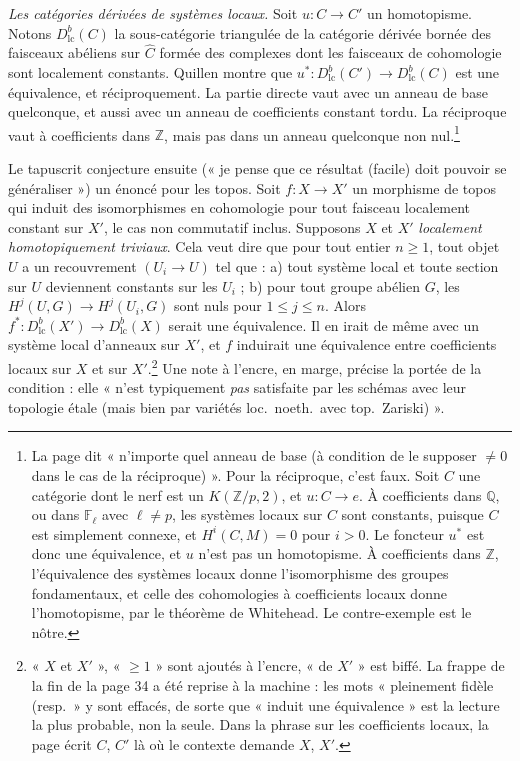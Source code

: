 \documentclass[11pt,a4paper]{article}
\begin{document}
\emph{Les catégories dérivées de systèmes locaux.} Soit $u : C \to C'$ un
homotopisme. Notons $D^{b}_{\mathrm{lc}}(C)$ la sous-catégorie triangulée de
la catégorie dérivée bornée des faisceaux abéliens sur $\widehat{C}$ formée des
complexes dont les faisceaux de cohomologie sont localement constants. Quillen
montre que $u^{*} : D^{b}_{\mathrm{lc}}(C') \to D^{b}_{\mathrm{lc}}(C)$ est une
équivalence, et réciproquement. La partie directe vaut avec un anneau de
base quelconque, et aussi avec un anneau de coefficients constant tordu. La
réciproque vaut à coefficients dans $\mathbb{Z}$, mais pas dans un anneau
quelconque non nul.\footnote{La page dit « n'importe quel anneau de base (à
condition de le supposer $\neq 0$ dans le cas de la réciproque) ». Pour la
réciproque, c'est faux. Soit $C$ une catégorie dont le nerf est un
$K(\mathbb{Z}/p, 2)$, et $u : C \to e$. À coefficients dans $\mathbb{Q}$, ou
dans $\mathbb{F}_{\ell}$ avec $\ell \neq p$, les systèmes locaux sur $C$ sont
constants, puisque $C$ est simplement connexe, et $H^{i}(C, M) = 0$ pour
$i > 0$. Le foncteur $u^{*}$ est donc une équivalence, et $u$ n'est pas un
homotopisme. À coefficients dans $\mathbb{Z}$, l'équivalence des systèmes
locaux donne l'isomorphisme des groupes fondamentaux, et celle des
cohomologies à coefficients locaux donne l'homotopisme, par le théorème de
Whitehead. Le contre-exemple est le nôtre.}

Le tapuscrit conjecture ensuite (« je pense que ce résultat (facile) doit
pouvoir se généraliser ») un énoncé pour les topos. Soit $f : X \to X'$ un
morphisme de topos qui induit des isomorphismes en cohomologie pour tout
faisceau localement constant sur $X'$, le cas non commutatif inclus. Supposons
$X$ et $X'$ \emph{localement homotopiquement triviaux}. Cela veut dire que pour
tout entier $n \geq 1$, tout objet $U$ a un recouvrement $(U_i \to U)$ tel que :
a) tout système local et toute section sur $U$ deviennent constants sur les
$U_i$ ; b) pour tout groupe abélien $G$, les $H^{j}(U, G) \to H^{j}(U_i, G)$
sont nuls pour $1 \leq j \leq n$. Alors $f^{*} : D^{b}_{\mathrm{lc}}(X') \to
D^{b}_{\mathrm{lc}}(X)$ serait une équivalence. Il en irait de même avec un
système local d'anneaux sur $X'$, et $f$ induirait une équivalence entre
coefficients locaux sur $X$ et sur $X'$.\footnote{« $X$ et $X'$ », « $\geq 1$ »
sont ajoutés à l'encre, « de $X'$ » est biffé. La frappe de la fin de la page 34
a été reprise à la machine : les mots « pleinement fidèle (resp.\ » y sont
effacés, de sorte que « induit une équivalence » est la lecture la plus
probable, non la seule. Dans la phrase sur les coefficients locaux, la page
écrit $C$, $C'$ là où le contexte demande $X$, $X'$.} Une note à l'encre, en
marge, précise la portée de la condition : elle « n'est typiquement \emph{pas}
satisfaite par les schémas avec leur topologie étale (mais bien par variétés
loc.\ noeth.\ avec top.\ Zariski) ».
\end{document}
